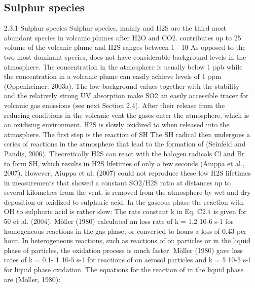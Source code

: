 \documentclass  [
  paper    = a4,
  BCOR     = 10mm,
  twoside,
  fontsize = 12pt,
  fleqn,
  toc      = bibnumbered,
  toc      = listofnumbered,
  numbers  = noendperiod,
  headings = normal,
  listof   = leveldown,
  version  = 3.03
]                                       {scrreprt}
\begin{document}
	\subsection{Sulphur species}
	2.3.1 Sulphur species
	Sulphur species, mainly  and H2S are the third most abundant species in
	volcanic plumes after H2O and CO2.  contributes up to 25%
	volume of the volcanic plume and H2S ranges between 1 - 10%
	As opposed to the two most dominant species,  does not have considerable
	background levels in the atmosphere. The  concentration in the atmosphere
	is usually below 1 ppb while the concentration in a volcanic plume can easily
	achieve levels of 1 ppm (Oppenheimer, 2003a). The low background values
	together with the stability and the relatively strong UV absorption make SO2
	an easily accessible tracer for volcanic gas emissions (see next Section 2.4).
	After their release from the reducing conditions in the volcanic vent the gases
	enter the atmosphere, which is an oxidising environment. H2S is slowly oxidized
	to  when released into the atmosphere. The first step is the reaction of SH
	The SH radical then undergoes a series of reactions in the atmosphere that
	lead to the formation of  (Seinfeld and Pandis, 2006). Theoretically H2S
	can react with the halogen radicals Cl and Br to form SH, which results in H2S
	lifetimes of only a few seconds (Aiuppa et al., 2007). However, Aiuppa et al.
	(2007) could not reproduce these low H2S lifetimes in measurements that showed
	a constant SO2/H2S ratio at distances up to several kilometres from the vent.
	 is removed from the atmosphere by wet and dry deposition or oxidized to
	sulphuric acid. In the gaseous phase the reaction with OH to sulphuric acid is
	rather slow:
	The rate constant k in Eq. C2.4 is given for 50%
	et al. (2004). Möller (1980) calculated an  loss rate of k = 1.2 10-6 s-1 for
	homogeneous reactions in the gas phase, or converted to hours a loss of 0.43%
	 per hour. In heterogeneous reactions, such as reactions of  on particles
	or in the liquid phase of particles, the oxidation process is much faster. Möller
	(1980) gave loss rates of k = 0.1- 1 10-5 s-1 for reactions of  on aerosol
	particles and k = 5 10-5 s-1 for liquid phase oxidation. The equations for the reaction of  in the liquid phase are (Möller, 1980):
\end{document}
